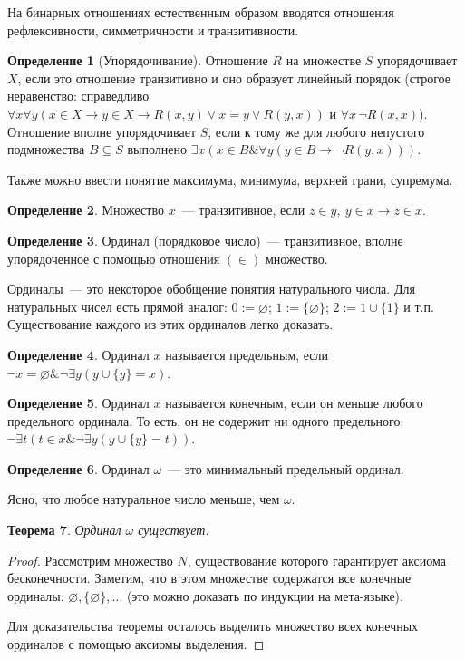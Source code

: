 \documentclass[a4paper,11pt]{article}
\newtheorem{thm}{Теорема}[section]
\theoremstyle{definition}
\newtheorem{dfn}[thm]{Определение}
\newcommand{\amp}{\mathbin{\&}}
\begin{document}
На бинарных отношениях естественным образом вводятся отношения рефлексивности,
симметричности и транзитивности.

\begin{dfn}[Упорядочивание]
Отношение $R$ на множестве $S$ упорядочивает $X$, если это отношение
транзитивно и оно образует линейный порядок (строгое неравенство: справедливо
$\forall x\forall y(x \in X \to y \in X \to R(x, y) \vee x = y \vee R(y, x))$ и
$\forall x\,\neg R(x, x)$). Отношение вполне упорядочивает $S$, если к тому же
для любого непустого подмножества $B \subseteq S$ выполнено $\exists x(x \in B
\amp \forall y(y \in B \to \neg R(y, x)))$.
\end{dfn}

Также можно ввести понятие максимума, минимума, верхней грани, супремума.

\begin{dfn}
Множество $x$~--- транзитивное, если $z \in y,\ y \in x \to z \in x$.
\end{dfn}

\begin{dfn}
Ординал (порядковое число)~--- транзитивное, вполне упорядоченное с помощью
отношения $(\in)$ множество.
\end{dfn}

Ординалы~--- это некоторое обобщение понятия натурального числа. Для натуральных
чисел есть прямой аналог: $0 := \varnothing$; $1 := \{\varnothing\}$; $2 := 1
\cup \{1\}$ и т.п. Существование каждого из этих ординалов легко доказать.

\begin{dfn}
Ординал $x$ называется предельным, если $\neg x = \varnothing \amp
\neg\exists y(y \cup \{y\} = x)$.
\end{dfn}

\begin{dfn}
Ординал $x$ называется конечным, если он меньше любого предельного ординала. То
есть, он не содержит ни одного предельного: $\neg\exists t(t \in x \amp
\neg\exists y(y \cup \{y\} = t))$.
\end{dfn}

\begin{dfn}
Ординал $\omega$~--- это минимальный предельный ординал.
\end{dfn}

Ясно, что любое натуральное число меньше, чем $\omega$.

\begin{thm}
Ординал $\omega$ существует.
\end{thm}
\begin{proof}
Рассмотрим множество $N$, существование которого гарантирует аксиома
бесконечности. Заметим, что в этом множестве содержатся все конечные ординалы:
$\varnothing, \{\varnothing\}, \dots$ (это можно доказать по индукции на
мета-языке).

Для доказательства теоремы осталось выделить множество всех конечных ординалов
с помощью аксиомы выделения.
\end{proof}
\end{document}
